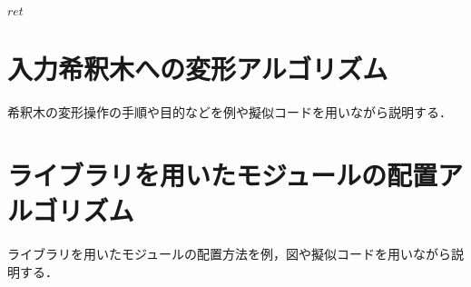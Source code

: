 \begin{algorithm}[tbp]
\begin{algorithmic}[1]
     \Return $\mathit{ret}$
 \end{algorithmic}
\end{algorithm}

\section{入力希釈木への変形アルゴリズム}
希釈木の変形操作の手順や目的などを例や擬似コードを用いながら説明する．
\section{ライブラリを用いたモジュールの配置{アルゴリズム}}
ライブラリを用いたモジュールの配置方法を例，図や擬似コードを用いながら説明する．
